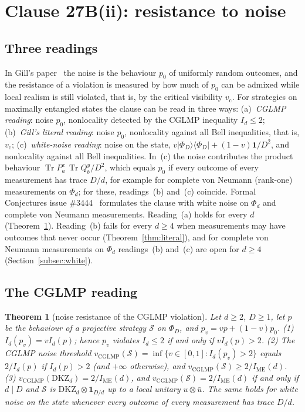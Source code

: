 \documentclass[11pt]{article}
\newtheorem{theorem}{Theorem}
\theoremstyle{remark}
\numberwithin{equation}{section}
\newcommand{\Tr}{\operatorname{Tr}}
\newcommand{\IME}{I_{\mathrm{ME}}}
\newcommand{\one}{\mathbf{1}}
\newcommand{\vc}{v_{\mathrm c}}
\newcommand{\DKZ}{\mathrm{DKZ}}
\begin{document}
\section{Clause 27B(ii): resistance to noise}\label{sec:noise}

\subsection{Three readings}\label{subsec:readings}
In Gill's paper~\cite{Gill} the noise is the behaviour $p_0$ of uniformly random outcomes, and the resistance of a
violation is measured by how much of $p_0$ can be admixed while local realism is still violated, that is, by the
critical visibility $\vc$. For strategies on maximally entangled states the clause can be read in three ways:
(a)~\emph{CGLMP reading}: noise $p_0$, nonlocality detected by the CGLMP inequality $I_d\le2$;
(b)~\emph{Gill's literal reading}: noise $p_0$, nonlocality against all Bell inequalities, that is, $\vc$;
(c)~\emph{white-noise reading}: noise on the state, $v|\Phi_D\rangle\langle\Phi_D|+(1-v)\one/D^2$, and
nonlocality against all Bell inequalities. In~(c) the noise contributes the product behaviour $\Tr P^x_a\,\Tr
Q^y_b/D^2$, which equals $p_0$ if every outcome of every measurement has trace $D/d$, for example for complete von
Neumann (rank-one) measurements on $\Phi_d$; for these, readings~(b) and~(c) coincide. Formal Conjectures issue
\#3444~\cite{FC3444} formulates the clause with white noise on $\Phi_d$ and complete von Neumann measurements.
Reading~(a) holds for every $d$ (Theorem~\ref{thm:noisecglmp}). Reading~(b) fails for every $d\ge4$ when measurements
may have outcomes that never occur (Theorem~\ref{thm:literal}), and for complete von Neumann measurements on $\Phi_d$
readings~(b) and~(c) are open for $d\ge4$ (Section~\ref{subsec:white}).

\subsection{The CGLMP reading}\label{subsec:noisecglmp}

\begin{theorem}[noise resistance of the CGLMP violation]\label{thm:noisecglmp}
Let $d\ge2$, $D\ge1$, let $p$ be the behaviour of a projective strategy $\mathcal S$ on $\Phi_D$, and
$p_v=vp+(1-v)p_0$. \textup{(1)} $I_d(p_v)=vI_d(p)$; hence $p_v$ violates $I_d\le2$ if and only if $vI_d(p)>2$.
\textup{(2)} The CGLMP noise threshold $v_{\mathrm{CGLMP}}(\mathcal S)=\inf\{v\in[0,1]:I_d(p_v)>2\}$ equals $2/I_d(p)$
if $I_d(p)>2$ \textup{(}and $+\infty$ otherwise\textup{)}, and $v_{\mathrm{CGLMP}}(\mathcal S)\ge2/\IME(d)$.
\textup{(3)} $v_{\mathrm{CGLMP}}(\DKZ_d)=2/\IME(d)$, and $v_{\mathrm{CGLMP}}(\mathcal S)=2/\IME(d)$ if and only if $d\mid
D$ and $\mathcal S$ is $\DKZ_d\otimes\one_{D/d}$ up to a local unitary $u\otimes\bar u$. The same holds for white noise
on the state whenever every outcome of every measurement has trace $D/d$.
\end{theorem}
\end{document}
